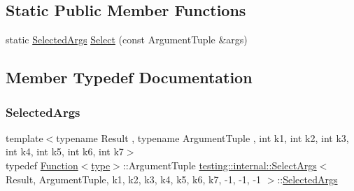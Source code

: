 \subsection*{Static Public Member Functions}
\begin{DoxyCompactItemize}
\item 
static \mbox{\hyperlink{classtesting_1_1internal_1_1SelectArgs_3_01Result_00_01ArgumentTuple_00_01k1_00_01k2_00_01k3_00_39929402cb68b57f60e280a41eb60fed_a128e1c494007a7bffd3d0a88a4dd7825}{Selected\+Args}} \mbox{\hyperlink{classtesting_1_1internal_1_1SelectArgs_3_01Result_00_01ArgumentTuple_00_01k1_00_01k2_00_01k3_00_39929402cb68b57f60e280a41eb60fed_a0cf7d28342dd284de849c9776387c192}{Select}} (const Argument\+Tuple \&args)
\end{DoxyCompactItemize}


\subsection{Member Typedef Documentation}
\mbox{\label{classtesting_1_1internal_1_1SelectArgs_3_01Result_00_01ArgumentTuple_00_01k1_00_01k2_00_01k3_00_39929402cb68b57f60e280a41eb60fed_a128e1c494007a7bffd3d0a88a4dd7825}} 
\subsubsection{\texorpdfstring{SelectedArgs}{SelectedArgs}}
{\footnotesize\ttfamily template$<$typename Result , typename Argument\+Tuple , int k1, int k2, int k3, int k4, int k5, int k6, int k7$>$ \\
typedef \mbox{\hyperlink{structtesting_1_1internal_1_1Function}{Function}}$<$\mbox{\hyperlink{classtesting_1_1internal_1_1SelectArgs_3_01Result_00_01ArgumentTuple_00_01k1_00_01k2_00_01k3_00_39929402cb68b57f60e280a41eb60fed_a9a44113ab59893cfc38ae45451a5b654}{type}}$>$\+::Argument\+Tuple \mbox{\hyperlink{classtesting_1_1internal_1_1SelectArgs}{testing\+::internal\+::\+Select\+Args}}$<$ Result, Argument\+Tuple, k1, k2, k3, k4, k5, k6, k7, -\/1, -\/1, -\/1 $>$\+::\mbox{\hyperlink{classtesting_1_1internal_1_1SelectArgs_3_01Result_00_01ArgumentTuple_00_01k1_00_01k2_00_01k3_00_39929402cb68b57f60e280a41eb60fed_a128e1c494007a7bffd3d0a88a4dd7825}{Selected\+Args}}}


